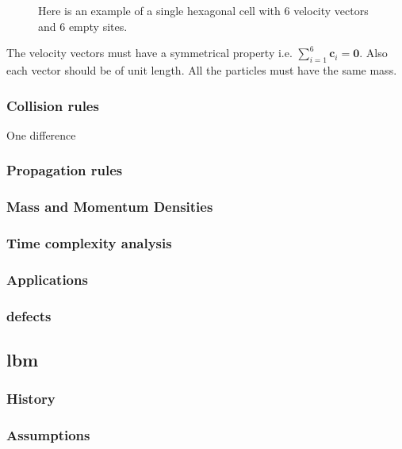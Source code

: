 \documentclass[a4paper,10pt]{article}
\begin{document}
\begin{figure}[H]
  \caption{Here is an example of a single hexagonal cell with 6 velocity vectors and 6 empty sites.}
  \label{figure:Hsingle-cell}
\end{figure}
\noindent The velocity vectors must have a symmetrical property i.e. $\sum_{i = 1}^{6} \textbf{c}_{i} = \textbf{0}$. Also each vector should be of unit length. All the particles must have the same mass.
\subsubsection{Collision rules}
One difference 
\subsubsection{Propagation rules}
\subsubsection{Mass and Momentum Densities}
\subsubsection{Time complexity analysis}
\subsubsection{Applications}
\subsubsection{defects}
\subsection{\Acrfull{lbm}}
\subsubsection{History}
\subsubsection{Assumptions}
\end{document}
